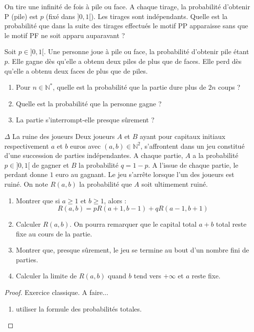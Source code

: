 \documentclass[french,a4paper]{article}
\newcommand{\N}{\mathbb{N}}
\newcommand{\st}{^*}
\theoremstyle{plain}
\theoremstyle{definition}
\theoremstyle{remark}
\begin{document}
\begin{ex}[Moulin.38]{}
	On tire une infinité de fois à pile ou face. A chaque tirage, la probabilité d'obtenir P (pile) est $p$ (fixé dans $]0,1[$). Les tirages sont indépendants. Quelle est la probabilité que dans la suite des tirages effectués le motif PP apparaisse sans que le motif PF ne soit apparu auparavant ?
\end{ex}

\begin{ex}[Moulin.39]{}
	Soit $p\in]0,1[$. Une personne joue à pile ou face, la probabilité d'obtenir pile étant $p$. Elle gagne dès qu'elle a obtenu deux piles de plus que de faces. Elle perd dès qu'elle a obtenu deux faces de plus que de piles.
	\begin{enumerate}
		\item Pour $n\in\N\st$, quelle est la probabilité que la partie dure plus de $2n$ coups ?
		\item Quelle est la probabilité que la personne gagne ?
		\item La partie s'interrompt-elle presque sûrement ?
	\end{enumerate}
\end{ex}

\begin{ex}[Moulin.40]{$\Delta$ La ruine des joueurs}
	Deux joueurs $A$ et $B$ ayant pour capitaux initiaux respectivement $a$ et $b$ euros avec $(a,b)\in\N^2$, s'affrontent dans un jeu constitué d'une succession de parties indépendantes. A chaque partie, $A$ a la probabilité $p\in]0,1[$ de gagner et $B$ la probabilité $q=1-p$. A l'issue de chaque partie, le perdant donne $1$ euro au gagnant. Le jeu s'arrête lorsque l'un des joueurs est ruiné. On note $R(a,b)$ la probabilité que $A$ soit ultimement ruiné.
	\begin{enumerate}
		\item Montrer que si $a\geqslant 1$ et $b\geqslant 1$, alors : $$R(a,b)=pR(a+1,b-1)+qR(a-1,b+1)$$
		\item Calculer $R(a,b)$. On pourra remarquer que le capital total $a+b$ total reste fixe au cours de la partie.
		\item Montrer que, presque sûrement, le jeu se termine au bout d'un nombre fini de parties.
		\item Calculer la limite de $R(a,b)$ quand $b$ tend vers $+\infty$ et $a$ reste fixe.
	\end{enumerate}
\end{ex}
\begin{proof}
	Exercice classique. A faire...
	\begin{enumerate}
		\item utiliser la formule des probabilités totales.
	\end{enumerate}
\end{proof}
\end{document}
